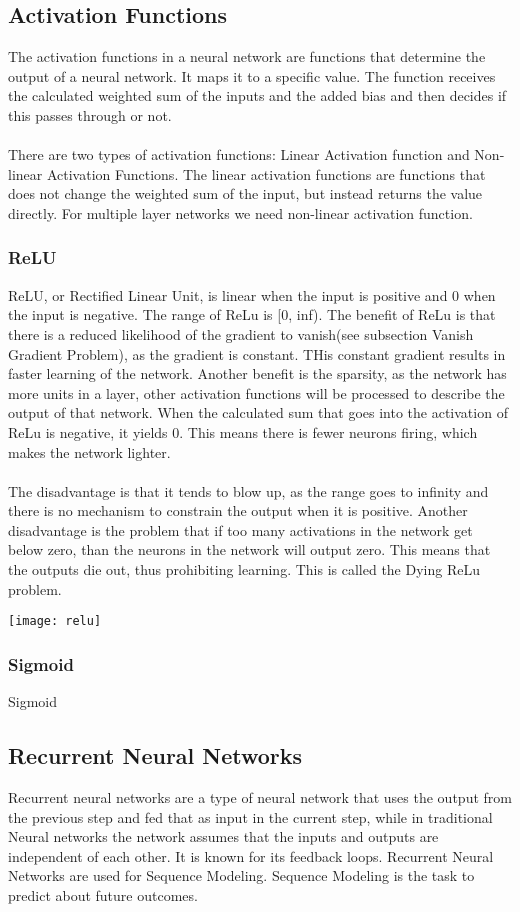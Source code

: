 \subsection{Activation Functions}
The activation functions in a neural network are functions that determine the output of a neural network. It maps it to a specific value. The function receives the calculated weighted sum of the inputs and the added bias and then decides if this passes through or not. \\\\
There are two types of activation functions: Linear Activation function and Non-linear Activation Functions.
The linear activation functions are functions that does not change the weighted sum of the input, but instead returns the value directly. For multiple layer networks we need non-linear activation function.

\subsubsection{ReLU}
ReLU, or Rectified Linear Unit, is linear when the input is positive and 0 when the input is negative. The range of ReLu is [0, inf). The benefit of ReLu is that there is a reduced likelihood of the gradient to vanish(see subsection Vanish Gradient Problem), as the gradient is constant. THis constant gradient results in faster learning of the network. Another benefit is the sparsity, as the network has more units in a layer, other activation functions will be processed to describe the output of that network. When the calculated sum that goes into the activation of ReLu is negative, it yields 0. This means there is fewer neurons firing, which makes the network lighter.\\\\
The disadvantage is that it tends to blow up, as the range goes to infinity and there is no mechanism to constrain the output when it is positive. Another disadvantage is the problem that if too many activations in the network get below zero, than the neurons in the network will output zero. This means that the outputs die out, thus prohibiting learning. This is called the Dying ReLu problem.

\texttt{[image: relu]}


\subsubsection{Sigmoid}
Sigmoid 


\subsection{Recurrent Neural Networks}
Recurrent neural networks are a type of neural network that uses the output from the previous step and fed that as input in the current step, while in traditional Neural networks the network assumes that the inputs and outputs are independent of each other. It is known for its feedback loops. Recurrent Neural Networks are used for Sequence Modeling. Sequence Modeling is the task to predict about future outcomes. 


